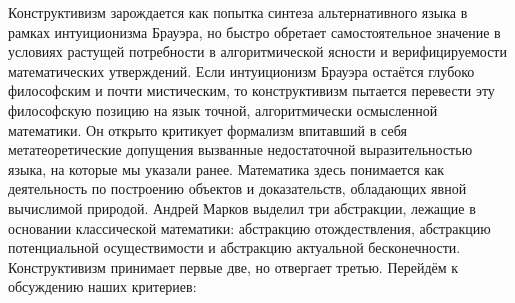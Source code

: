 \documentclass[12pt]{article}
\begin{document}
Конструктивизм зарождается как попытка синтеза альтернативного языка в рамках интуиционизма Брауэра, но быстро обретает самостоятельное значение в условиях растущей потребности в алгоритмической ясности и верифицируемости математических утверждений. Если интуиционизм Брауэра остаётся глубоко философским и почти мистическим, то конструктивизм пытается перевести эту философскую позицию на язык точной, алгоритмически осмысленной математики. Он открыто критикует формализм впитавший в себя метатеоретические допущения вызванные недостаточной выразительностью языка, на которые мы указали ранее. Математика здесь понимается как деятельность по построению объектов и доказательств, обладающих явной вычислимой природой. Андрей Марков выделил три абстракции, лежащие в основании классической математики: абстракцию отождествления, абстракцию потенциальной осуществимости и абстракцию актуальной бесконечности. Конструктивизм принимает первые две, но отвергает третью. Перейдём к обсуждению наших критериев:
\end{document}
